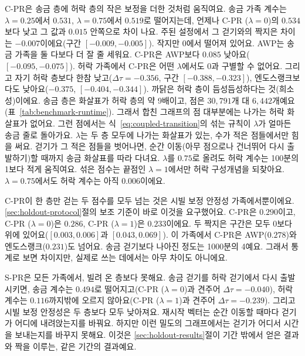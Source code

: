 

C-PR은 송금 층에 허락 층의 작은 보정을 더한 것처럼 움직여요. 송금 가족 계수는 $\lambda=0.25$에서 $0.531$, $\lambda=0.75$에서 $0.519$로 떨어지는데, 언제나 C-PR ($\lambda=0$)의 $0.534$보다 낮고 그 값과 $0.015$ 안쪽으로 차이 나요. 주된 설정에서 그 걷기와의 짝지은 차이는 $-0.007$이에요(구간 $[-0.009,-0.005]$). 작지만 0에서 떨어져 있어요. AWP는 송금 가족을 둘 다보다 더 잘 줄 세워요. C-PR은 AWP보다 $0.085$ 낮아요($[-0.095,-0.075]$). 허락 가족에서 C-PR은 어떤 $\lambda$에서도 0과 구별할 수 없어요. 그리고 자기 허락 층보다 한참 낮고($\Delta\tau=-0.356$, 구간 $[-0.388,-0.323]$), 엔도스랭크보다도 낮아요($-0.375$, $[-0.404,-0.344]$). 까닭은 허락 층이 듬성듬성하다는 것(희소성)이에요. 송금 층은 화살표가 허락 층의 약 9배이고, 점은 $30{,}791$개 대 $6{,}442$개예요(표~\ref{tab:benchmark-runtime}). 그래서 합친 그래프의 점 대부분에는 나가는 허락 화살표가 없어요. 그런 점에서는 식~\eqref{eq:coupled-transition}의 섞는 규칙이 $\lambda$가 얼마든 송금 줄로 돌아가요. $\lambda$는 두 층 모두에 나가는 화살표가 있는, 수가 적은 점들에서만 힘을 써요. 걷기가 그 적은 점들을 벗어나면, 순간 이동(아무 점으로나 건너뛰어 다시 출발하기)할 때까지 송금 화살표를 따라 다녀요. $\lambda$를 $0.75$로 올려도 허락 계수는 100분의 1보다 적게 움직여요. 섞은 점수는 끝점인 $\lambda=1$에서만 허락 구성개념을 되찾아요. $\lambda=0.75$에서도 허락 계수는 아직 $0.006$이에요.

C-PR이 한 층만 걷는 두 점수를 모두 넘는 것은 시빌 보정 안정성 가족에서뿐이에요. \ref{sec:holdout-protocol}절의 보조 기준이 바로 이것을 요구했어요. C-PR은 $0.290$이고, C-PR ($\lambda=0$)은 $0.286$, C-PR ($\lambda=1$)은 $0.233$이에요. 두 짝지은 구간은 모두 0보다 위에 있어요($[0.003,0.006]$과 $[0.043,0.069]$). 이 가족에서 C-PR은 AWP($0.278$)와 엔도스랭크($0.231$)도 넘어요. 송금 걷기보다 나아진 정도는 1000분의 4예요. 그래서 통계로 보면 차이지만, 실제로 쓰는 데에서는 아무 차이도 아니에요.

S-PR은 모든 가족에서, 빌려 온 층보다 못해요. 송금 걷기를 허락 걷기에서 다시 출발시키면, 송금 계수는 $0.494$로 떨어지고(C-PR ($\lambda=0$)과 견주어 $\Delta\tau=-0.040$), 허락 계수는 $0.116$까지밖에 오르지 않아요(C-PR ($\lambda=1$)과 견주어 $\Delta\tau=-0.239$). 그리고 시빌 보정 안정성은 두 층보다 모두 낮아져요. 재시작 벡터는 순간 이동할 때마다 걷기가 어디에 내려앉는지를 바꿔요. 하지만 이런 밀도의 그래프에서는 걷기가 어디서 시간을 보내는지를 바꾸지 못해요. 이것은 \ref{sec:holdout-results}절이 기간 밖에서 얻은 결과와 짝을 이루는, 같은 기간의 결과예요.

